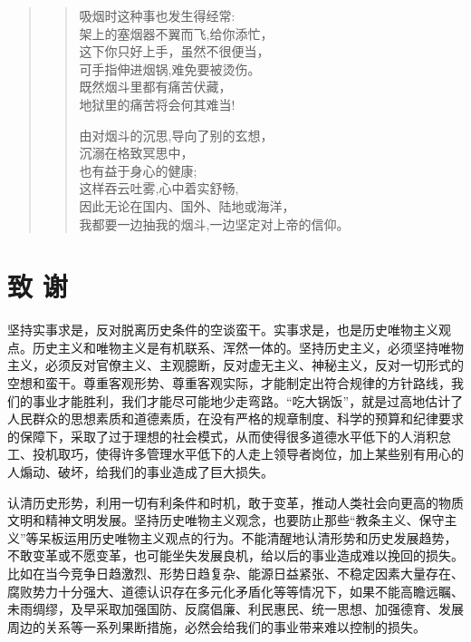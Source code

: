 \documentclass[openany,oneside]{book}
\theoremstyle{cthmstyle}
\theoremstyle{definition}
\theoremstyle{remark}
\begin{document}
\begin{quote}
\begin{verse}
        吸烟时这种事也发生得经常:\\
        \hspace{1em}架上的塞烟器不翼而飞,给你添忙，\\
        这下你只好上手，虽然不很便当，\\
        \hspace{1em}可手指伸进烟锅,难免要被烫伤。\\
        \hspace{2em}既然烟斗里都有痛苦伏藏，\\
        \hspace{2em}地狱里的痛苦将会何其难当!\\
        \vspace{1em}
        
        由对烟斗的沉思,导向了别的玄想，\\
        \hspace{1em}沉溺在格致冥思中，\\
        也有益于身心的健康;\\
        \hspace{1em}这样吞云吐雾,心中着实舒畅,\\
        \hspace{2em}因此无论在国内、国外、陆地或海洋，\\
        \hspace{2em}我都要一边抽我的烟斗,一边坚定对上帝的信仰。\\
    \end{verse}
\end{quote}



%
\clearpage
{}
{}
\nocite{*} %

\chapter*{致 \qquad 谢}
\thispagestyle{empty}

坚持实事求是，反对脱离历史条件的空谈蛮干。实事求是，也是历史唯物主义观点。历史主义和唯物主义是有机联系、浑然一体的。坚持历史主义，必须坚持唯物主义，必须反对官僚主义、主观臆断，反对虚无主义、神秘主义，反对一切形式的空想和蛮干。尊重客观形势、尊重客观实际，才能制定出符合规律的方针路线，我们的事业才能胜利，我们才能尽可能地少走弯路。“吃大锅饭”，就是过高地估计了人民群众的思想素质和道德素质，在没有严格的规章制度、科学的预算和纪律要求的保障下，采取了过于理想的社会模式，从而使得很多道德水平低下的人消积怠工、投机取巧，使得许多管理水平低下的人走上领导者岗位，加上某些别有用心的人煽动、破坏，给我们的事业造成了巨大损失。

认清历史形势，利用一切有利条件和时机，敢于变革，推动人类社会向更高的物质文明和精神文明发展。坚持历史唯物主义观念，也要防止那些“教条主义、保守主义”等呆板运用历史唯物主义观点的行为。不能清醒地认清形势和历史发展趋势，不敢变革或不愿变革，也可能坐失发展良机，给以后的事业造成难以挽回的损失。比如在当今竞争日趋激烈、形势日趋复杂、能源日益紧张、不稳定因素大量存在、腐败势力十分强大、道德认识存在多元化矛盾化等等情况下，如果不能高瞻远瞩、未雨绸缪，及早采取加强国防、反腐倡廉、利民惠民、统一思想、加强德育、发展周边的关系等一系列果断措施，必然会给我们的事业带来难以控制的损失。
\end{document}
